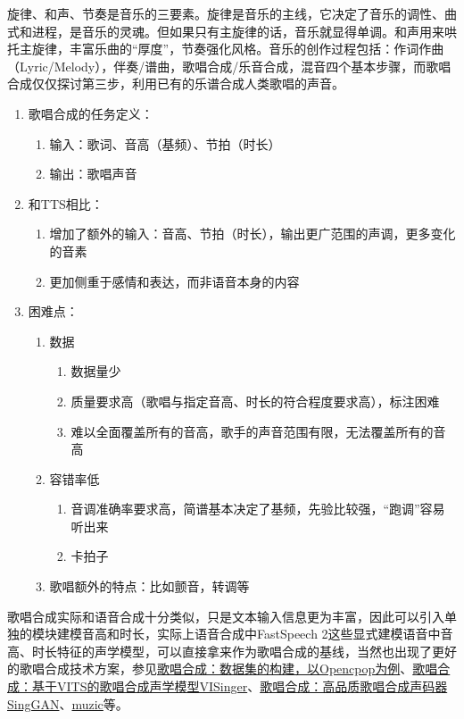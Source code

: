 \documentclass[cn,10pt,math=newtx,citestyle=gb7714-2015,bibstyle=gb7714-2015]{elegantbook}
\begin{document}
旋律、和声、节奏是音乐的三要素。旋律是音乐的主线，它决定了音乐的调性、曲式和进程，是音乐的灵魂。但如果只有主旋律的话，音乐就显得单调。和声用来哄托主旋律，丰富乐曲的“厚度”，节奏强化风格。音乐的创作过程包括：作词作曲（Lyric/Melody），伴奏/谱曲，歌唱合成/乐音合成，混音四个基本步骤，而歌唱合成仅仅探讨第三步，利用已有的乐谱合成人类歌唱的声音。

\begin{enumerate}
  \item 歌唱合成的任务定义：
  \begin{enumerate}
    \item 输入：歌词、音高（基频）、节拍（时长）
    \item 输出：歌唱声音
  \end{enumerate}

  \item 和TTS相比：
  \begin{enumerate}
    \item 增加了额外的输入：音高、节拍（时长），输出更广范围的声调，更多变化的音素
    \item 更加侧重于感情和表达，而非语音本身的内容
  \end{enumerate}

  \item 困难点：
  \begin{enumerate}
    \item 数据
    \begin{enumerate}
      \item 数据量少
      \item 质量要求高（歌唱与指定音高、时长的符合程度要求高），标注困难
      \item 难以全面覆盖所有的音高，歌手的声音范围有限，无法覆盖所有的音高
    \end{enumerate}
  
    \item 容错率低
    \begin{enumerate}
      \item 音调准确率要求高，简谱基本决定了基频，先验比较强，“跑调”容易听出来
      \item 卡拍子
    \end{enumerate}
  
    \item 歌唱额外的特点：比如颤音，转调等
  \end{enumerate}
\end{enumerate}

歌唱合成实际和语音合成十分类似，只是文本输入信息更为丰富，因此可以引入单独的模块建模音高和时长，实际上语音合成中FastSpeech 2这些显式建模语音中音高、时长特征的声学模型，可以直接拿来作为歌唱合成的基线，当然也出现了更好的歌唱合成技术方案，参见\href{https://zhuanlan.zhihu.com/p/481137047}{歌唱合成：数据集的构建，以Opencpop为例}、\href{https://zhuanlan.zhihu.com/p/481154682}{歌唱合成：基于VITS的歌唱合成声学模型VISinger}、\href{https://zhuanlan.zhihu.com/p/481158408}{歌唱合成：高品质歌唱合成声码器SingGAN}、\href{https://github.com/microsoft/muzic}{muzic}等。
\end{document}
